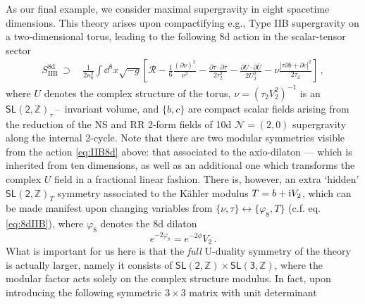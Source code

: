 As our final example, we consider maximal supergravity in eight spacetime dimensions. This theory arises upon compactifying e.g., Type IIB supergravity on a two-dimensional torus, leading to the following 8d action in the scalar-tensor sector
%
\begin{equation}\label{eq:IIB8d}
		\begin{aligned}
			S_\text{IIB}^{\text{8d}}\, \supset\, & \frac{1}{2\kappa_{8}^2} \int \dd^{8}x\sqrt{-g} \left[\mathcal{R}-\frac{1}{6}\frac{(\partial \nu)^2}{\nu^2} -\frac{\partial \tau \cdot \partial \bar \tau}{2 \tau_2^2} -\frac{\partial U \cdot \partial \bar U}{2 U_2^2} - \nu \frac{\left| \tau \partial b + \partial c\right|^2}{2\tau_2}\right]\, ,
		\end{aligned}
\end{equation}
%
where $U$ denotes the complex structure of the torus, $\nu= \left( \tau_2 V_2^2\right)^{-1}$ is an $\mathsf{SL(2,\mathbb{Z})}_{\tau}\,$--\, invariant volume, and $\{ b,c\}$ are compact scalar fields arising from the reduction of the NS and RR 2-form fields of 10d $\mathcal{N}=(2,0)$ supergravity along the internal 2-cycle. Note that there are two modular symmetries visible from the action \eqref{eq:IIB8d} above: that associated to the axio-dilaton --- which is inherited from ten dimensions, as well as an additional one which transforms the complex $U$ field in a fractional linear fashion. There is, however, an extra `hidden' $\mathsf{SL(2,\mathbb{Z})}_{T}$ symmetry associated to the K\"ahler modulus $T=b+ \text{i} V_2$, %
which can be made manifest upon changing variables from $\lbrace \nu, \tau\rbrace \leftrightarrow \lbrace \varphi_8, T\rbrace$ (c.f. eq. \eqref{eq:8dIIB}), where $\varphi_8$ denotes the 8d dilaton
%
\begin{equation}\label{eq:8ddilaton}
     e^{-2\varphi_8} = e^{-2\phi} V_2\, .
\end{equation}
%
What is important for us here is that the \emph{full} U-duality symmetry of the theory is actually larger, namely it consists of $\mathsf{SL(2,\mathbb{Z})} \times \mathsf{SL(3,\mathbb{Z})}$, where the modular factor acts solely on the complex structure modulus. In fact, upon introducing the following symmetric  $3\times3$ matrix with unit determinant \cite{Liu:1997mb}
%
\beq\label{eq:SL3matrix}
